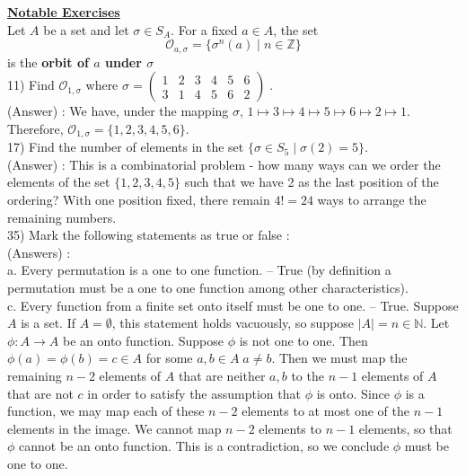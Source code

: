 \documentclass[12pt, letterpaper]{article}
\begin{document}
\noindent \underline{\bf Notable Exercises} \\

Let $A$ be a set and let $\sigma \in S_A$. For a fixed $a \in A$, the set $$\mathscr{O}_{a,\sigma} = \{\sigma^n(a) \; | \; n \in \mathbb{Z} \}$$
is the {\bf orbit of $a$ under $\sigma$} \\

11) Find $\mathscr{O}_{1,\sigma}$ where $\sigma = \begin{pmatrix}
1&2&3&4&5&6 \\ 3&1&4&5&6&2
\end{pmatrix} \;$. \\

(Answer) : We have, under the mapping $\sigma$, $1 \mapsto 3 \mapsto 4 \mapsto 5 \mapsto 6 \mapsto 2 \mapsto 1$. Therefore, $\mathscr{O}_{1,\sigma} = \{1,2,3,4,5,6\}$.\\

17) Find the number of elements in the set $\{\sigma \in S_5 \; | \; \sigma(2) = 5\}$. \\

(Answer) : This is a combinatorial problem - how many ways can we order the elements of the set $\{1,2,3,4,5\}$ such that we have 2 as the last position of the ordering? With one position fixed, there remain $4! = 24$ ways to arrange the remaining numbers. \\

35) Mark the following statements as true or false : \\

(Answers) : \\

a. Every permutation is a one to one function.  -- True (by definition a permutation must be a one to one function among other characteristics). \\

c. Every function from a finite set onto itself must be one to one. -- True. Suppose $A$ is a set. If $A = \emptyset$, this statement holds vacuously, so suppose $|A| = n \in \mathbb{N}$. Let $\phi : A \rightarrow A$ be an onto function. Suppose $\phi$ is not one to one. Then $\phi(a) = \phi(b) = c \in A$ for some $a,b \in A \; a \neq b$. Then we must map the remaining $n-2$ elements of $A$ that are neither $a,b$ to the $n-1$ elements of $A$ that are not $c$ in order to satisfy the assumption that $\phi$ is onto. Since $\phi$ is a function, we may map each of these $n-2$ elements to at most one of the $n-1$ elements in the image. We cannot map $n-2$ elements to $n-1$ elements, so that $\phi$ cannot be an onto function. This is a contradiction, so we conclude $\phi$ must be one to one. \\
\end{document}
